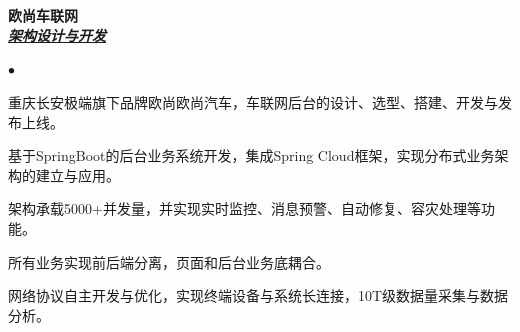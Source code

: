 \documentclass[UTF8]{ctexart}
\newcommand{\lineunder}{\vspace*{-8pt} \\
\hspace*{-18pt} \hrulefill \\}
\newcommand{\header}[1]{\large \vspace*{12pt}{\Large \hspace*{-15pt}\vspace*{6pt} \textsc{#1}} \vspace*{-6pt} \lineunder}
\newcommand{\website}[3]{{\normalsize \textbf{#1}\\
\underline{\textbf{\emph{#3}}}\\
}}
\newenvironment{achievements}{
\begin{list}
        {$\bullet$}{\topsep 0pt
        \itemsep 0pt}}{\vspace*{4pt}
\end{list}
}
\begin{document}
\header{项目经验}
\website{\textbf{欧尚车联网}}{}{架构设计与开发}
\begin{achievements}
    \item
    重庆长安极端旗下品牌欧尚欧尚汽车，车联网后台的设计、选型、搭建、开发与发布上线。
    \item
    基于SpringBoot的后台业务系统开发，集成Spring Cloud框架，实现分布式业务架构的建立与应用。
    \item
    架构承载5000+并发量，并实现实时监控、消息预警、自动修复、容灾处理等功能。
    \item
    所有业务实现前后端分离，页面和后台业务底耦合。
    \item
    网络协议自主开发与优化，实现终端设备与系统长连接，10T级数据量采集与数据分析。
\end{achievements}

\newpage
\end{document}
